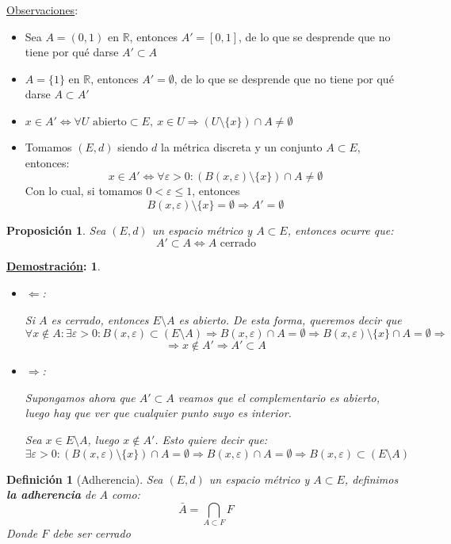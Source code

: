 \documentclass[10pt,a4paper,openright]{book}
\theoremstyle{break}
\newtheorem*{defi}{Definición}
\newtheorem*{prop}{Proposición}
\newtheorem*{demo}{\underline{Demostración}:}
\begin{document}
\underline{Observaciones}:
\begin{itemize}
\item Sea $A=(0,1)$ en $\mathbb{R}$, entonces $A'=[0,1]$, de lo que se desprende que no tiene por qué darse $A'\subset A$
\item $A = \{1\}$ en $\mathbb{R}$, entonces $A' = \emptyset$, de lo que se desprende que no tiene por qué darse $A\subset A'$
\item $x\in A' \Leftrightarrow \forall U \mbox{ abierto} \subset E, \ x\in U \Rightarrow \left( U\setminus\{x\}\right) \cap A \neq \emptyset$
\item Tomamos $(E,d)$ siendo $d$ la métrica discreta y un conjunto $A\subset E$, entonces:
$$x\in A' \Leftrightarrow \forall \varepsilon > 0: \left( B(x,\varepsilon) \setminus\{x\}\right) \cap A \neq \emptyset$$
Con lo cual, si tomamos $0 < \varepsilon \leq 1$, entonces
$$B(x,\varepsilon)\setminus\{x\} =\emptyset \Rightarrow A' = \emptyset$$
\end{itemize}

\begin{prop}
Sea $(E,d)$ un espacio métrico y $A\subset E$, entonces ocurre que:
$$A'\subset A \Leftrightarrow A \mbox{ cerrado}$$
\end{prop}
\begin{demo}
\begin{itemize}
\item $\Leftarrow$:

Si $A$ es cerrado, entonces $E\setminus A$ es abierto. De esta forma, queremos decir que
$$\forall x \notin A : \exists \varepsilon > 0 : B(x,\varepsilon)\subset (E\setminus A) \Rightarrow B(x,\varepsilon) \cap A = \emptyset \Rightarrow B(x,\varepsilon)\setminus \{x\} \cap A = \emptyset \Rightarrow$$
$$\Rightarrow x \notin A' \Rightarrow A' \subset A$$

\item $\Rightarrow$:

Supongamos ahora que $A'\subset A$ veamos que el complementario es abierto, luego hay que ver que cualquier punto suyo es interior.

Sea $x\in E\setminus A$, luego $x\notin A'$. Esto quiere decir que:
$$\exists \varepsilon > 0 : \left(B(x,\varepsilon)\setminus\{x\}\right)\cap A = \emptyset \Rightarrow B(x,\varepsilon)\cap A = \emptyset \Rightarrow B(x,\varepsilon)\subset (E\setminus A)$$
\end{itemize}
\end{demo}

\begin{defi}[Adherencia]
Sea $(E,d)$ un espacio métrico y $A \subset E$, definimos \textbf{la adherencia} de $A$ como:
$$\bar{A} = \bigcap_{A\subset F } F$$
Donde $F$ debe ser cerrado
\end{defi}
\end{document}
